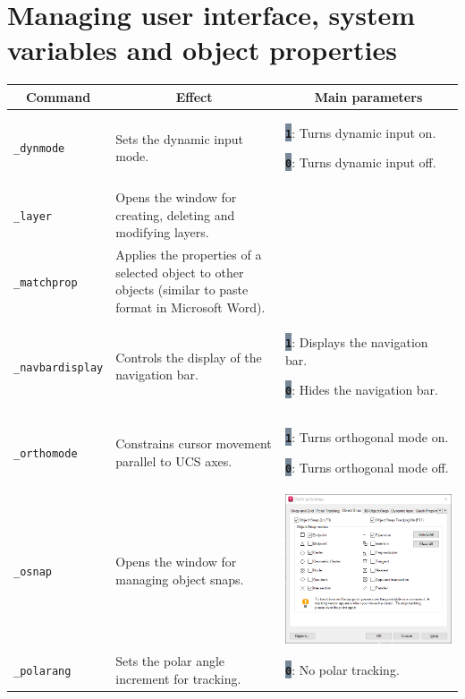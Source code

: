 \documentclass[..]{../IEEEphot}
\newcommand{\param}[1]{\colorbox{LightSlateGray}{\color{Navy}\texttt{\textbf{#1}}}}
\begin{document}
\section{Managing user interface, system variables and object properties}
\begin{center}
\begin{longtable}{m{.2\linewidth}m{.33\linewidth}m{.33\linewidth}}
\toprule
    \multicolumn{1}{c}{\bfseries Command} &
    \multicolumn{1}{c}{\bfseries Effect} &
    \multicolumn{1}{c}{\bfseries Main parameters} \\
\midrule
\texttt{\_dynmode} & Sets the dynamic input mode. & 
\param{1}: Turns dynamic input on.

\param{0}: Turns dynamic input off.
\\
\midrule
\texttt{\_layer} & Opens the window for creating, deleting and modifying layers. & 
\\
\midrule
\texttt{\_matchprop} & Applies the properties of a selected object to other objects (similar to paste format in Microsoft Word). & 
\\
\midrule
\texttt{\_navbardisplay} & Controls the display of the navigation bar. & 
\param{1}: Displays the navigation bar.

\param{0}: Hides the navigation bar.
\\
\midrule
\texttt{\_orthomode} & Constrains cursor movement parallel to UCS axes. & 
\param{1}: Turns orthogonal mode on.

\param{0}: Turns orthogonal mode off.
\\
\midrule
\texttt{\_osnap} & Opens the window for managing object snaps. & \includegraphics[width = 0.8\linewidth, keepaspectratio]{../images/png/_osnap_en.png}
\\
\midrule
\texttt{\_polarang} & Sets the polar angle increment for tracking. & 
\param{0}: No polar tracking.


\end{longtable}
\end{center}
\end{document}
